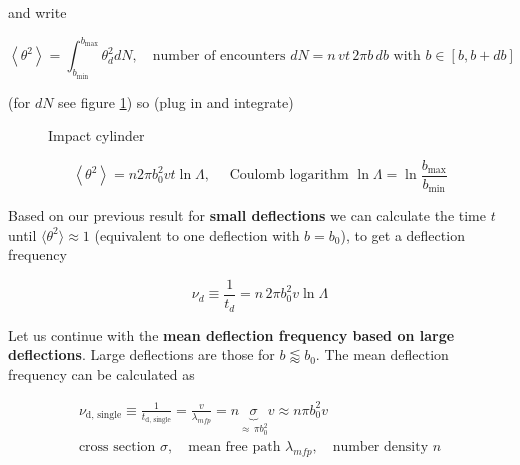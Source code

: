 and write

\begin{equation}
    \left\langle\theta^2\right\rangle=\int_{b_{\min }}^{b_{\max }} \theta_d^2 d N, \quad \text{number of encounters } dN = n \, vt \, 2\pi b \, db \text{ with } b \in [b, b+db]
\end{equation}

(for $dN$ see figure \ref{fig:impact_cylinder}) so (plug in and integrate)

\begin{figure}
    \centering
    
    \caption{Impact cylinder}
    \label{fig:impact_cylinder}
\end{figure}

\begin{equation}
    \boxed{\left\langle\theta^2\right\rangle=n 2 \pi b_0^2 v t \ln \Lambda, \quad \text { Coulomb logarithm } \ln \Lambda=\ln \frac{b_{\max }}{b_{\min }}}
\end{equation}


Based on our previous result for \textbf{small deflections} we can calculate the time
$t$ until $\langle \theta^2 \rangle \approx 1$ (equivalent to one deflection with $b = b_0$),
to get a deflection frequency

\begin{equation}
    \nu_d \equiv \frac{1}{t_d} = n \, 2 \pi b_0^2 v \ln \Lambda
\end{equation}

Let us continue with the \textbf{mean deflection frequency based on large deflections}.
Large deflections are those for $b \lessapprox b_0$. The mean deflection frequency
can be calculated as

\begin{equation}
    \begin{gathered}
        \nu_{\text{d, single}} \equiv \frac{1}{t_\text{d, single}} = \frac{v}{\lambda_{mfp}} = n\underbrace{\sigma}_{\approx\,\pi b_0^2} v \approx n \pi b_0^2 v \\
        \text{cross section } \sigma, \quad \text{mean free path } \lambda_{mfp}, \quad \text{number density } n
    \end{gathered}
\end{equation}

